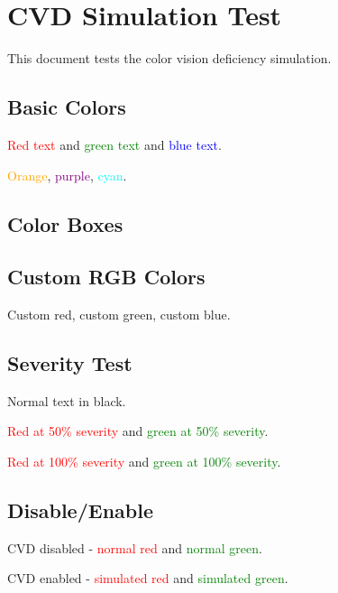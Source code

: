 \documentclass{article}
\begin{document}
\section{CVD Simulation Test}

This document tests the color vision deficiency simulation.

\subsection{Basic Colors}

\textcolor{red}{Red text} and \textcolor{green}{green text} and \textcolor{blue}{blue text}.

\textcolor{orange}{Orange}, \textcolor{purple}{purple}, \textcolor{cyan}{cyan}.

\subsection{Color Boxes}


\subsection{Custom RGB Colors}


\textcolor{myred}{Custom red}, \textcolor{mygreen}{custom green}, \textcolor{myblue}{custom blue}.

\subsection{Severity Test}

Normal text in black.

\textcolor{red}{Red at 50\% severity} and \textcolor{green}{green at 50\% severity}.

\textcolor{red}{Red at 100\% severity} and \textcolor{green}{green at 100\% severity}.

\subsection{Disable/Enable}

\cvddisable
CVD disabled - \textcolor{red}{normal red} and \textcolor{green}{normal green}.

\cvdenable
CVD enabled - \textcolor{red}{simulated red} and \textcolor{green}{simulated green}.

\end{document}
